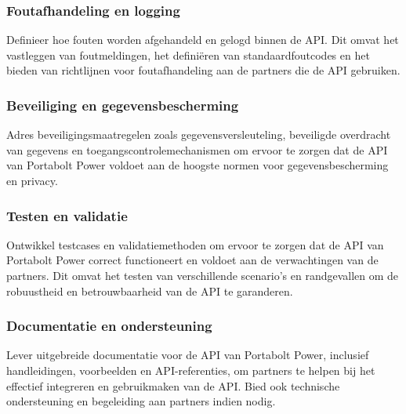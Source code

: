 \subsubsection{Foutafhandeling en logging}
Definieer hoe fouten worden afgehandeld en gelogd binnen de API. Dit omvat het vastleggen van foutmeldingen, het definiëren van standaardfoutcodes en het bieden van richtlijnen voor foutafhandeling aan de partners die de API gebruiken.

\subsubsection{Beveiliging en gegevensbescherming}
Adres beveiligingsmaatregelen zoals gegevensversleuteling, beveiligde overdracht van gegevens en toegangscontrolemechanismen om ervoor te zorgen dat de API van Portabolt Power voldoet aan de hoogste normen voor gegevensbescherming en privacy.

\subsubsection{Testen en validatie}
Ontwikkel testcases en validatiemethoden om ervoor te zorgen dat de API van Portabolt Power correct functioneert en voldoet aan de verwachtingen van de partners. Dit omvat het testen van verschillende scenario's en randgevallen om de robuustheid en betrouwbaarheid van de API te garanderen.

\subsubsection{Documentatie en ondersteuning}
Lever uitgebreide documentatie voor de API van Portabolt Power, inclusief handleidingen, voorbeelden en API-referenties, om partners te helpen bij het effectief integreren en gebruikmaken van de API. Bied ook technische ondersteuning en begeleiding aan partners indien nodig.
